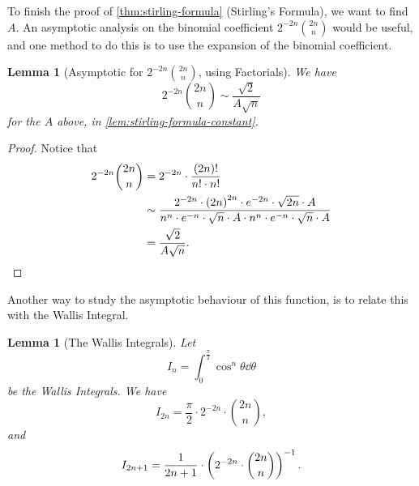 \documentclass{article}
\newtheorem{lemma}[theorem]{Lemma}
\theoremstyle{definition}
\theoremstyle{remark}
\newcommand{\inverse}{^{-1}}
\begin{document}
To finish the proof of \autoref{thm:stirling-formula} (Stirling's Formula), we want to find \(A\). An asymptotic analysis on the binomial coefficient \(2^{-2n} \binom{2n}{n}\) would be useful, and one method to do this is to use the expansion of the binomial coefficient.

\begin{lemma}[Asymptotic for \(2^{-2n} \binom{2n}{n}\), using Factorials]
    \label{lem:asymptotic-binomial-factorial}%
    We have
    \[
        2^{-2n} \binom{2n}{n} \sim \frac{\sqrt{2}}{A \sqrt{n}}
    \]
    for the \(A\) above, in \autoref{lem:stirling-formula-constant}.
\end{lemma}

\begin{proof}
    Notice that
    \begin{align*}
        2^{-2n} \binom{2n}{n} &= 2^{-2n} \cdot \frac{\left(2n\right)!}{n! \cdot n!} \\
        &\sim \frac{2^{-2n} \cdot \left(2n\right)^{2n} \cdot e^{-2n} \cdot \sqrt{2n} \cdot A}{n^n \cdot e^{-n} \cdot \sqrt{n} \cdot A \cdot n^n \cdot e^{-n} \cdot \sqrt{n} \cdot A} \\
        &= \frac{\sqrt{2}}{A \sqrt{n}}.
    \end{align*}
\end{proof}

Another way to study the asymptotic behaviour of this function, is to relate this with the Wallis Integral.

\begin{lemma}[The Wallis Integrals]
    \label{lem:wallis-integral}%
    Let
    \[
        I_n = \int_{0}^{\frac{\pi}{2}} \cos^n \theta \dd{\theta}
    \]
    be the Wallis Integrals. We have
    \[
        I_{2n} = \frac{\pi}{2} \cdot 2^{-2n} \cdot \binom{2n}{n},
    \]
    and
    \[
        I_{2n + 1} = \frac{1}{2n + 1} \cdot \pqty{2^{-2n} \cdot \binom{2n}{n}}\inverse.
    \]
\end{lemma}
\end{document}
